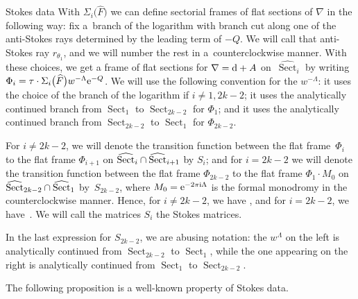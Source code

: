 \begin{subsubsection}{Stokes data}
With $\Sigma_i\bigl(\widehat{F}\bigr)$ we can define sectorial frames of flat sections of $\nabla$ in the following way: fix a~branch of the logarithm with branch cut along one of the anti-Stokes rays determined by the leading term of $-Q$. We will call that anti-Stokes ray $r_{\theta_1}$, and we will number the rest in a~counterclockwise manner. With these choices, we get a frame of flat sections for $\nabla={\rm d}+A$ on~$\widehat{\operatorname{Sect}}_i$ by writing $\Phi_i=\tau \cdot \Sigma_i\bigl(\widehat{F}\bigr)w^{-\Lambda} {\rm e}^{-Q}$. We will use the following convention for the $w^{-\Lambda}$: it uses the choice of the branch of the logarithm if $i\neq 1,2k-2$; it uses the analytically continued branch from $\operatorname{Sect}_1$ to $\operatorname{Sect}_{2k-2}$ for $\Phi_1$; and it uses the analytically continued branch from $\operatorname{Sect}_{2k-2}$ to $\operatorname{Sect}_{1}$ for $\Phi_{2k-2}$.

\begin{Definition} \label{defStokesmatrices} For $i\neq 2k-2$, we will denote the transition function between the flat frame~$\Phi_{i}$ to the flat frame $\Phi_{i+1}$ on $\widehat{\textnormal{Sect}}_{i}\cap\widehat{\textnormal{Sect}}_{i+1}$ by $S_{i}$; and for $i=2k-2$ we will denote the transition function between the flat frame $\Phi_{2k-2}$ to the flat frame $\Phi_1 \cdot M_0$ on~${\widehat{\textnormal{Sect}}_{2k-2}\cap\widehat{\textnormal{Sect}}_{1}}$ by~$S_{2k-2}$, where $M_0={\rm e}^{-2\pi {\rm i} \Lambda}$ is the formal monodromy in the counterclockwise manner.
Hence, for $i\neq 2k-2$, we have , and for $i=2k-2$, we have~. We will call the matrices $S_i$ the Stokes matrices.
\end{Definition}

\begin{Remark} In the last expression for $S_{2k-2}$, we are abusing notation: the $w^{\Lambda}$ on the left is analytically continued from $\operatorname{Sect}_{2k-2}$ to $\operatorname{Sect}_1$, while the one appearing on the right is analytically continued from $\operatorname{Sect}_1$ to $\operatorname{Sect}_{2k-2}$.
\end{Remark}

The following proposition is a well-known property of Stokes data.


\end{subsubsection}
